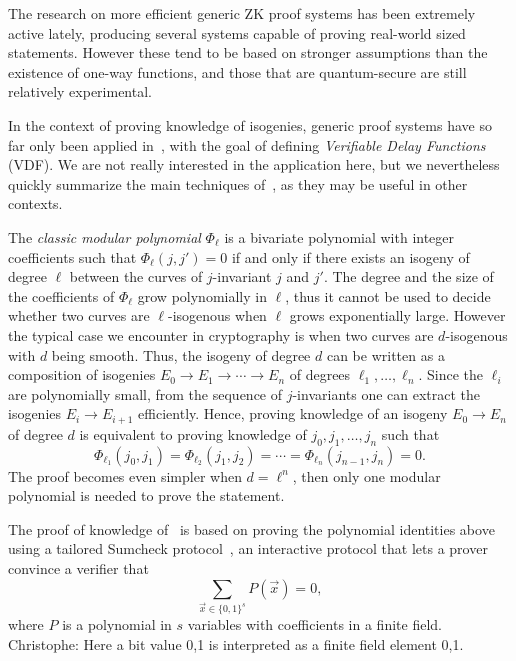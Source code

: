 \documentclass{llncs}
\newcommand{\comment}[1]{{\color{gray}#1}}
\newcommand{\CP}[1]{\comment{Christophe: #1}}
\begin{document}
The research on more efficient generic ZK proof systems has been extremely active lately, producing several systems capable of proving real-world sized statements.
However these tend to be based on stronger assumptions than the existence of one-way functions, and those that are quantum-secure are still relatively experimental.

In the context of proving knowledge of isogenies, generic proof systems have so far only been applied in~\cite{10.1007/978-3-030-99277-4_21}, with the goal of defining \emph{Verifiable Delay Functions} (VDF).
We are not really interested in the application here, but we nevertheless quickly summarize the main techniques of~\cite{10.1007/978-3-030-99277-4_21}, as they may be useful in other contexts.

The \emph{classic modular polynomial} $\Phi_\ell$ is a bivariate polynomial with integer coefficients such that $\Phi_\ell(j, j') = 0$ if and only if there exists an isogeny of degree $\ell$ between the curves of $j$-invariant $j$ and $j'$.
The degree and the size of the coefficients of $\Phi_\ell$ grow polynomially in $\ell$, thus it cannot be used to decide whether two curves are $\ell$-isogenous when $\ell$ grows exponentially large.
However the typical case we encounter in cryptography is when two curves are $d$-isogenous with $d$ being smooth.
Thus, the isogeny of degree $d$ can be written as a composition of isogenies $E_0 \to E_1 \to \cdots \to E_n$ of degrees $\ell_1, \ldots, \ell_n$.
Since the $\ell_i$ are polynomially small, from the sequence of $j$-invariants one can extract the isogenies $E_i \to E_{i+1}$ efficiently. Hence, proving knowledge of an isogeny $E_0 \to E_n$ of degree $d$ is equivalent to proving knowledge of $j_0, j_1, \ldots, j_n$ such that
\begin{equation}
    \label{eq:modpol}
    \Phi_{\ell_1}(j_0, j_1) = \Phi_{\ell_2}(j_1, j_2) = \cdots = \Phi_{\ell_n}(j_{n-1},j_n) = 0.
\end{equation}
The proof becomes even simpler when $d = \ell^n$, then only one modular polynomial is needed to prove the statement.

The proof of knowledge of~\cite{10.1007/978-3-030-99277-4_21} is based on proving the  polynomial identities above using a tailored Sumcheck protocol~\cite{10.1145/146585.146605}, an interactive protocol that lets a prover convince a verifier that
\begin{equation}
    \sum_{\vec{x}\in\{0,1\}^s} P(\vec{x}) = 0,
\end{equation}
where $P$ is a polynomial in $s$ variables with coefficients in a finite field. \CP{Here a bit value 0,1 is interpreted as a finite field element 0,1.}
\end{document}
